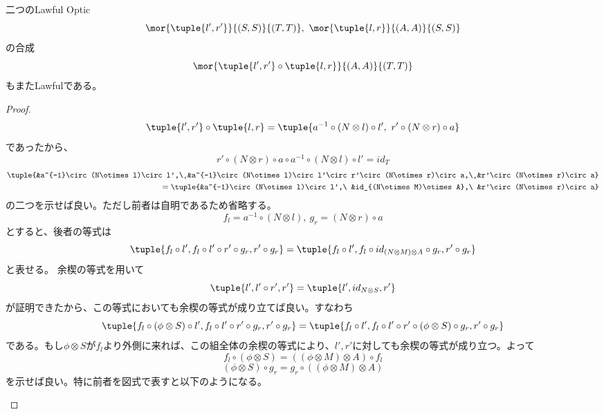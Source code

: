 \documentclass[uplatex,dvipdfmx]{jsarticle}
\begin{document}
  \begin{prop}[lawful性の合成における閉性]
    二つのLawful Optic \[\mor{\tuple{l',r'}}{(S,S)}{(T,T)},\ \mor{\tuple{l,r}}{(A,A)}{(S,S)}\]の合成\[\mor{\tuple{l',r'}\circ\tuple{l,r}}{(A,A)}{(T,T)}\]もまたLawfulである。
  \end{prop}
  \begin{proof}
    \[\tuple{l',r'}\circ\tuple{l,r}=\tuple{a^{-1}\circ(N\otimes l)\circ l',\ r'\circ(N\otimes r)\circ a}\]であったから、
    \[r'\circ(N\otimes r)\circ a\circ a^{-1}\circ(N\otimes l)\circ l'=id_T\]
    \begin{alignat*}{2}
      \tuple{&a^{-1}\circ(N\otimes l)\circ l',\ &a^{-1}\circ(N\otimes l)\circ l'\circ r'\circ(N\otimes r)\circ a,\ &r'\circ(N\otimes r)\circ a}\\
      =\tuple{&a^{-1}\circ(N\otimes l)\circ l',\ &id_{(N\otimes M)\otimes A},\ &r'\circ(N\otimes r)\circ a}
    \end{alignat*}
    の二つを示せば良い。ただし前者は自明であるため省略する。
    \[f_l = a^{-1}\circ(N\otimes l), \ g_r = (N\otimes r)\circ a\]とすると、後者の等式は\[\tuple{f_l\circ l',f_l\circ l'\circ r'\circ g_r, r'\circ g_r}=\tuple{f_l\circ l',f_l\circ id_{(N\otimes M)\otimes A}\circ g_r, r'\circ g_r}\]と表せる。
    余楔の等式を用いて\[\tuple{l',l'\circ r', r'} = \tuple{l', id_{N\otimes S}, r'}\]が証明できたから、この等式においても余楔の等式が成り立てば良い。すなわち\[\tuple{f_l\circ(\phi\otimes S) \circ l',f_l\circ l'\circ r'\circ g_r, r'\circ g_r} = \tuple{f_l\circ l',f_l \circ l'\circ r'\circ(\phi\otimes S)\circ g_r, r'\circ g_r}\]である。もし$\phi\otimes S$が$f_l$より外側に来れば、この組全体の余楔の等式により、$l',r'$に対しても余楔の等式が成り立つ。よって\[f_l\circ(\phi\otimes S) = ((\phi\otimes M)\otimes A)\circ f_l\]\[(\phi\otimes S)\circ g_r = g_r\circ((\phi\otimes M)\otimes A)\]を示せば良い。特に前者を図式で表すと以下のようになる。

    \begin{center}
\end{center}
\end{proof}
\end{document}
